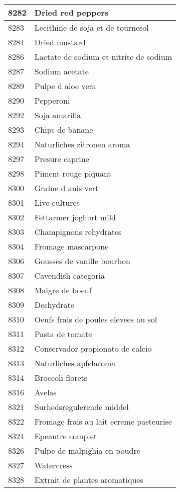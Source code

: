 \begin{longtable}{|l|l|}
8282 & Dried red peppers \\ \hline 
8283 & Lecithine de soja et de tournesol \\ \hline 
8284 & Dried mustard \\ \hline 
8286 & Lactate de sodium et nitrite de sodium \\ \hline 
8287 & Sodium acetate \\ \hline 
8289 & Pulpe d aloe vera \\ \hline 
8290 & Pepperoni \\ \hline 
8292 & Soja amarilla \\ \hline 
8293 & Chips de banane \\ \hline 
8294 & Naturliches zitronen aroma \\ \hline 
8297 & Presure caprine \\ \hline 
8298 & Piment rouge piquant \\ \hline 
8300 & Graine d anis vert \\ \hline 
8301 & Live cultures \\ \hline 
8302 & Fettarmer joghurt mild \\ \hline 
8303 & Champignons rehydrates \\ \hline 
8304 & Fromage mascarpone \\ \hline 
8306 & Gousses de vanille bourbon \\ \hline 
8307 & Cavendish categoria \\ \hline 
8308 & Maigre de boeuf \\ \hline 
8309 & Deshydrate \\ \hline 
8310 & Oeufs frais de poules elevees au sol \\ \hline 
8311 & Pasta de tomate \\ \hline 
8312 & Conservador propionato de calcio \\ \hline 
8313 & Naturliches apfelaroma \\ \hline 
8314 & Broccoli florets \\ \hline 
8316 & Avelas \\ \hline 
8321 & Surhedsregulerende middel \\ \hline 
8322 & Fromage frais au lait ecreme pasteurise \\ \hline 
8324 & Epeautre complet \\ \hline 
8326 & Pulpe de malpighia en poudre \\ \hline 
8327 & Watercress \\ \hline 
8328 & Extrait de plantes aromatiques \\ \hline 

\end{longtable}

